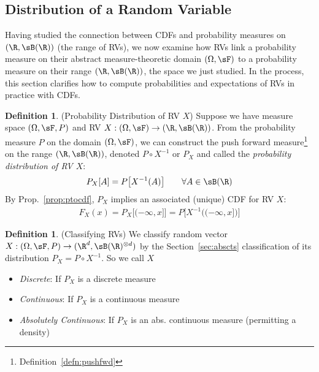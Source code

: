 \documentclass[12pt]{article}
\theoremstyle{plain}
\theoremstyle{definition}
\newtheorem{defn}[thm]{Definition}
\theoremstyle{remark}
\newcommand{\ra}{\rightarrow}
\begin{document}
\clearpage
\subsection{Distribution of a Random Variable}
\label{sec:dist}

Having studied the connection between CDFs and probability measures on
$(\R,\sB(\R))$ (the range of RVs), we now examine how RVs link a
probability measure on their abstract measure-theoretic domain
$(\Omega,\sF)$ to a probability  measure on their range $(\R,\sB(\R))$,
the space we just studied.
In the process, this section clarifies how to compute probabilities and
expectations of RVs in practice with CDFs.


\begin{defn}(Probability Distribution of RV $X$)
\label{defn:probdist}
Suppose we have measure space $(\Omega,\sF,P)$ and RV
$X:(\Omega,\sF)\ra (\R,\sB(\R))$. From the probability measure $P$ on
the domain $(\Omega,\sF)$, we can construct the push forward
measure\footnote{%
  Definition~\ref{defn:pushfwd}
}
on the range $(\R,\sB(\R))$, denoted $P \circ X^{-1}$ or $P_X$ and
called the \emph{probability distribution of RV $X$}:
\begin{align*}
  P_X[A] =
  P\big[ X^{-1}(A) \big]
  \qquad \forall A\in\sB(\R)
\end{align*}
By Prop.~\ref{prop:ptocdf}, $P_X$ implies an associated (unique) CDF for
RV $X$:
\begin{align*}
  F_X(x)
  = P_X\big[(-\infty,x]\big]
  = P\big[X^{-1}\big((-\infty,x]\big)\big]
\end{align*}
\end{defn}

\begin{defn}(Classifying RVs)
We classify random vector
$X:(\Omega,\sF,P)\ra(\R^d,\sB(\R)^{\otimes d})$
by the Section~\ref{sec:abscts} classification of its distribution
$P_X=P\circ X^{-1}$.
So we call $X$
\begin{itemize}
  \item \emph{Discrete}: If $P_X$ is a discrete measure
  \item \emph{Continuous}: If $P_X$ is a continuous measure
  \item \emph{Absolutely Continuous}: If $P_X$ is an
    abs. continuous measure (permitting a density)
\end{itemize}
\end{defn}
\end{document}
